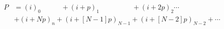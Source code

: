 \documentclass[preview]{standalone}
\begin{document}
\begin{align*}
P &= (i)_0\:\:\:\:\:\:\:\:\:\:\:\:\:+(i+p)_1\:\:\:\:\:\:\:\:\:\:\:\:\:\:\:\:\:\:\:\:\:+(i+2p)_2\cdots\\&+(i+Np)_n+(i+[N-1]p)_{N-1}+(i+[N-2]p)_{N-2}+\cdots
\end{align*}
\end{document}
